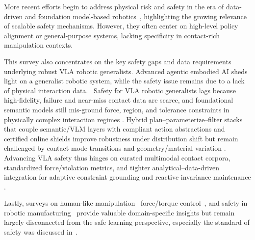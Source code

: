 \documentclass[Afour,sageh,times]{template/sagej}
\newcommand{\suggest}[1]{{\color{olive} (#1)}}
\begin{document}
More recent efforts begin to address physical risk and safety in the era of data-driven and foundation model-based robotics~\citep{kojima2025comprehensive,lamba2025alignment,xie2025towards,wabersich2023data},  highlighting the growing relevance of scalable safety mechanisms. However, they often center on high-level policy alignment or general-purpose systems, lacking specificity in contact-rich manipulation contexts.

This survey also concentrates on the key safety gaps and data requirements underlying robust VLA robotic generalists. Advanced agentic embodied AI sheds light on a generalist robotic system, while the safety issue remains due to a lack of physical interaction data.~\cite{salimpour2025towards}
Safety for VLA robotic generalists lags because high-fidelity, failure and near‑miss contact data are scarce, and foundational semantic models still mis‑ground force, region, and tolerance constraints in physically complex interaction regimes \citep{cruz2024learning}.  
Hybrid plan–parameterize–filter stacks that couple semantic/VLM layers with compliant action abstractions and certified online shields improve robustness under distribution shift but remain challenged by contact mode transitions and geometry/material variation \citep{33,330,10705419,das2025towards}.
Advancing VLA safety thus hinges on curated multimodal contact corpora, standardized force/violation metrics, and tighter analytical–data-driven integration for adaptive constraint grounding and reactive invariance maintenance \citep{salimpour2025towards}.

Lastly, surveys on human-like manipulation~\citep{huang2025human} force/torque control~\citep{sy2025review},  and safety in robotic manufacturing~\citep{lakshminarayanan2024robots} provide valuable domain-specific insights but remain largely disconnected from the safe learning perspective, especially the standard of safety was discussed in~\citep{lakshminarayanan2024robots}.
\end{document}
